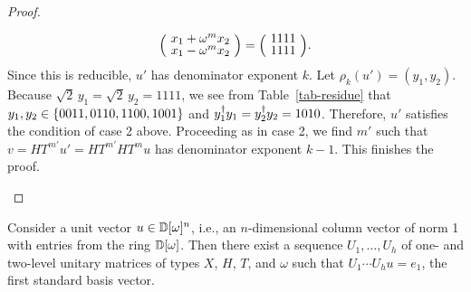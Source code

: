 \begin{proof}
\begin{itemize}
\[\begin{split}
        \zmatrix{c}{x_1+\omega^m x_2\\x_1-\omega^m x_2} =
        \zmatrix{c}{1111\\1111}.
      \end{split}
    \]
    Since this is reducible, $u'$ has denominator exponent $k$. Let $\rho_k(u')=(y_1,y_2)$. Because
    $\sqrt{2}\,y_1=\sqrt{2}\,y_2=1111$, we see from Table~\vref{tab-residue} that
    $y_1,y_2\in\{0011,0110,1100,1001\}$ and $y_1^{\dagger} y_1=y_2^{\dagger} y_2=1010$. Therefore, $u'$ satisfies
    the condition of case 2 above. Proceeding as in case 2, we find $m'$ such that $v=HT^{m'}
    u'=HT^{m'} HT^mu$ has denominator exponent $k-1$. This finishes the proof.\qedhere
  \end{itemize}
\end{proof}

\begin{lemma}\label{lem-column}
  Consider a unit vector $u\in\mathbb{D}[\omega]^n$, i.e., an $n$-dimensional column vector of norm 1 with entries
  from the ring $\mathbb{D}[\omega]$. Then there exist a sequence $U_1,\ldots,U_h$ of one- and two-level unitary
  matrices of types $X$, $H$, $T$, and $\omega$ such that $U_1\cdots U_hu = e_1$, the first
  standard basis vector.
\end{lemma}

